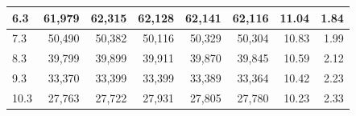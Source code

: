 \begin{table}[h]
\begin{tabular}{|l|r|r|r|r|r|r|r|}
		6.3                                                             & 61,979                                                        & 62,315                                                        & 62,128                                                        & 62,141                                                           & 62,116                                                          & 11.04                                                      & 1.84                                                       \\ \hline
		7.3                                                             & 50,490                                                        & 50,382                                                        & 50,116                                                        & 50,329                                                           & 50,304                                                          & 10.83                                                      & 1.99                                                       \\ \hline
		8.3                                                             & 39,799                                                        & 39,899                                                        & 39,911                                                        & 39,870                                                           & 39,845                                                          & 10.59                                                      & 2.12                                                       \\ \hline
		9.3                                                             & 33,370                                                        & 33,399                                                        & 33,399                                                        & 33,389                                                           & 33,364                                                          & 10.42                                                      & 2.23                                                       \\ \hline
		10.3                                                            & 27,763                                                        & 27,722                                                        & 27,931                                                        & 27,805                                                           & 27,780                                                          & 10.23                                                      & 2.33                                                       \\ \hline

\end{tabular}
\end{table}
